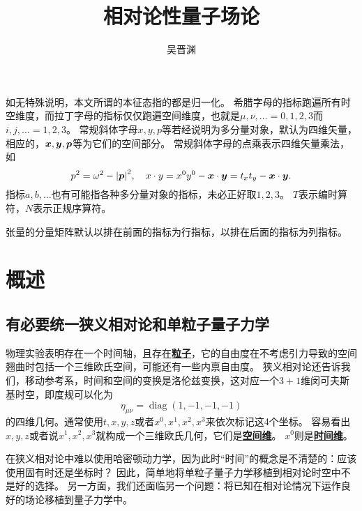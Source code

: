 \documentclass[hyperref, UTF8, a4paper]{ctexart}
\title{相对论性量子场论}
\author{吴晋渊}
\DeclareMathOperator{\diag}{diag}
\newcommand{\concept}[1]{\underline{\textbf{#1}}}
\begin{document}
\maketitle

\vspace{2em}

如无特殊说明，本文所谓的本征态指的都是归一化。
希腊字母的指标跑遍所有时空维度，而拉丁字母的指标仅仅跑遍空间维度，也就是$\mu, \nu, \ldots = 0, 1, 2, 3$而$i, j, \ldots = 1, 2, 3$。
常规斜体字母$x, y, p$等若经说明为多分量对象，默认为四维矢量，相应的，$\vb*{x}, \vb*{y}, \vb*{p}$等为它们的空间部分。
常规斜体字母的点乘表示四维矢量乘法，如
\[
    p^2 = \omega^2 - \abs{\vb*{p}}^2, \quad x \cdot y = x^0 y^0 - \vb*{x} \cdot \vb*{y} = t_x t_y - \vb*{x} \cdot \vb*{y}.
\]
指标$a,b,\ldots$也有可能指各种多分量对象的指标，未必正好取$1, 2, 3$。
$T$表示编时算符，$N$表示正规序算符。

张量的分量矩阵默认以排在前面的指标为行指标，以排在后面的指标为列指标。


\section{概述}

\subsection{有必要统一狭义相对论和单粒子量子力学}

物理实验表明存在一个时间轴，且存在\concept{粒子}，它的自由度在不考虑引力导致的空间翘曲时包括一个三维欧氏空间，可能还有一些内禀自由度。
狭义相对论还告诉我们，移动参考系，时间和空间的变换是洛伦兹变换，这对应一个$3+1$维闵可夫斯基时空，即度规可以化为
\begin{equation}
    \eta_{\mu\nu} = \diag (1, -1, -1, -1)
\end{equation}
的四维几何。通常使用$t, x, y, z$或者$x^0, x^1, x^2, x^3$来依次标记这4个坐标。
容易看出$x, y, z$或者说$x^1, x^2, x^3$就构成一个三维欧氏几何，它们是\concept{空间维}。
$x^0$则是\concept{时间维}。

在狭义相对论中难以使用哈密顿动力学，因为此时“时间”的概念是不清楚的：应该使用固有时还是坐标时？
因此，简单地将单粒子量子力学移植到相对论时空中不是好的选择。
另一方面，我们还面临另一个问题：将已知在相对论情况下运作良好的场论移植到量子力学中。
\end{document}
